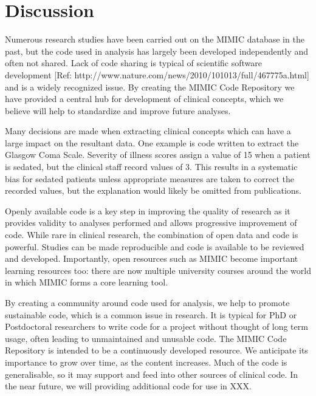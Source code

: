 \documentclass{bioinfo}
\begin{document}
\section{Discussion}



Numerous research studies have been carried out on the MIMIC database in the past, but the code used in analysis has largely been developed independently and often not shared. Lack of code sharing is typical of scientific software development [Ref: http://www.nature.com/news/2010/101013/full/467775a.html] and is a widely recognized issue. By creating the MIMIC Code Repository we have provided a central hub for development of clinical concepts, which we believe will help to standardize and improve future analyses.

Many decisions are made when extracting clinical concepts which can have a large impact on the resultant data. One example is code written to extract the Glasgow Coma Scale. Severity of illness scores assign a value of 15 when a patient is sedated, but the clinical staff record values of 3. This results in a systematic bias for sedated patients unless appropriate measures are taken to correct the recorded values, but the explanation would likely be omitted from publications. 

Openly available code is a key step in improving the quality of research as it provides validity to analyses performed and allows progressive improvement of code. While rare in clinical research, the combination of open data and code is powerful. Studies can be made reproducible and code is available to be reviewed and developed. Importantly, open resources such as MIMIC become important learning resources too: there are now multiple university courses around the world in which MIMIC forms a core learning tool. 

By creating a community around code used for analysis, we help to promote sustainable code, which is a common issue in research. It is typical for PhD or Postdoctoral researchers to write code for a project without thought of long term usage, often leading to unmaintained and unusable code. The MIMIC Code Repository is intended to be a continuously developed resource. We anticipate its importance to grow over time, as the content increases. Much of the code is generalisable, so it may support and feed into other sources of clinical code. In the near future, we will providing additional code for use in XXX.
\end{document}
